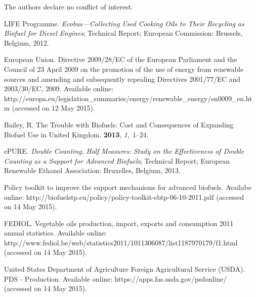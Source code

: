 \documentclass[sustainability,article,accept,moreauthors,pdftex,12pt,a4paper]{mdpi}
\begin{document}

The authors declare no conflict of interest.

\break
\makeatletter
\renewcommand\@biblabel[1]{#1.}
\makeatother

\begin{thebibliography}{----}

{LIFE Programme}.
\newblock \textit{Ecobus---Collecting Used Cooking Oils to Their Recycling as Biofuel
 for Diesel Engines};
\newblock Technical Report; European Commission: Brussels, Belgium, 2012.

{European Union}.
\newblock Directive 2009/28/EC of the European Parliament and the Council of 23
 April 2009 on the promotion of the use of energy from renewable sources and
 amending and subsequently repealing Directives 2001/77/EC and 2003/30/EC, 2009. Available online: http://europa.eu/legislation\_summaries/energy/renewable\_energy/en0009\_en.htm (accessed on 12 May 2015).

Bailey, R.
\newblock The Trouble with Biofuels: Cost and Consequences of Expanding Biofuel
 Use in United Kingdom.
 {\bf 2013}, {\em 1},~1--24.

ePURE.
\newblock \textit{Double Counting, Half Measures: Study on the Effectiveness of Double
Counting as a Support for Advanced Biofuels};
\newblock Technical Report; European Renewable Ethanol Association: Bruxelles, Belgium, 2013.

Policy toolkit to improve the support mechanisms for advanced biofuels. Availabe online: http://biofuelstp.eu/policy/policy-toolkit-ebtp-06-10-2011.pdf (accessed on 14 May 2015).

FEDIOL. 
\newblock Vegetable oils production, import, exports and consumption 2011
 annual statistics. Available online: http://www.fediol.be/web/statistics2011/1011306087/list1187970179/f1.html (accessed on 14 May 2015).

{United States Department of Agriculture Foreign Agricultural Service (USDA)}.
\newblock PDS - Production. Available online: https://apps.fas.usda.gov/psdonline/ (accessed on 14 May 2015).


\end{thebibliography}
\end{document}
